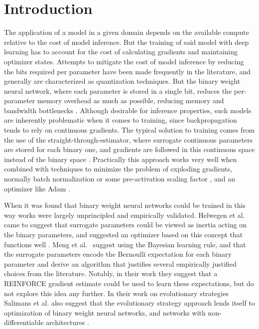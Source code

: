 \documentclass[runningheads]{llncs}
\begin{document}
\section{Introduction}
\label{sec:intro}

The application of a model in a given domain depends on the available compute relative to the cost of model inference. But the training of said model with deep learning has to account for the cost of calculating gradients and maintaining optimizer states. Attempts to mitigate the cost of model inference by reducing the bits required per parameter have been made frequently in the literature, and generally are characterized as quantization techniques. But the binary weight neural network, where each parameter is stored in a single bit, reduces the per-parameter memory overhead as much as possible, reducing memory and bandwidth bottlenecks
\cite{courbariaux2016binarized,rastegari2016xnor,yuan2023survey}. Although desirable for inference properties, such models are inherently problematic when it comes to training, since backpropagation tends to rely on continuous gradients. The typical solution to training comes from the use of the straight-through-estimator, where surrogate continuous parameters are stored for each binary one, and gradients are followed in this continuous space instead of the binary space \cite{bengio2013estimating}. Practically this approach works very well when combined with techniques to minimize the problem of exploding gradients, normally batch normalization or some pre-activation scaling factor
\cite{sari2019batchnorm}, and an optimizer like Adam \cite{liu2021adam,kingma2015adam}.

When it was found that binary weight neural networks could be trained in this way works were largely unprincipled and empirically validated. Helwegen et al. came to suggest that surrogate parameters could be viewed as inertia acting on the binary parameters, and suggested an optimizer based on this concept that functions well \cite{helwegen2019latent}. Meng et
al.~\cite{meng2020bayesian} suggest using the Bayesian learning rule, and that the surrogate parameters encode the Bernoulli expectation for each binary parameter and derive an algorithm that
justifies several empirically justified choices from the literature. Notably, in their work they suggest that a REINFORCE gradient estimate could be used to learn these expectations, but do not explore this idea any further. In their work on evolutionary strategies Salimans et al. also suggest that the evolutionary strategy approach lends itself to optimization of binary weight neural networks, and networks with non-differentiable architectures \cite{salimans2017evolution}.
\end{document}
